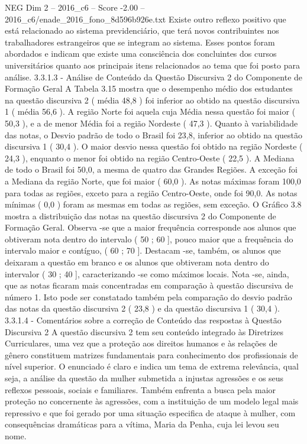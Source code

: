 \begin{textsample}{NEG Dim 2 – 2016\_c6 – Score -2.00 – 2016\_c6/enade\_2016\_fono\_8d596b926e.txt}
Existe outro reflexo positivo que está relacionado ao sistema previdenciário, que terá novos contribuintes nos trabalhadores estrangeiros que se integram ao sistema.
Esses pontos foram abordados e indicam que existe uma consciência dos concluintes dos cursos universitários quanto aos principais itens relacionados ao tema que foi posto para análise. 3.3.1.3 - Análise de Conteúdo da Questão Discursiva 2 do Componente de Formação Geral A Tabela 3.15 mostra que o desempenho médio dos estudantes na questão discursiva 2 ( média 48,8 ) foi inferior ao obtido na questão discursiva 1 ( média 56,6 ).
A região Norte foi aquela cuja Média nessa questão foi maior ( 50,3 ), e a de menor Média foi a região Nordeste ( 47,3 ).
Quanto à variabilidade das notas, o Desvio padrão de todo o Brasil foi 23,8, inferior ao obtido na questão discursiva 1 ( 30,4 ).
O maior desvio nessa questão foi obtido na região Nordeste ( 24,3 ), enquanto o menor foi obtido na região Centro-Oeste ( 22,5 ).
A Mediana de todo o Brasil foi 50,0, a mesma de quatro das Grandes Regiões.
A exceção foi a Mediana da região Norte, que foi maior ( 60,0 ).
As notas máximas foram 100,0 para todas as regiões, exceto para a região Centro-Oeste, onde foi 90,0.
As notas mínimas ( 0,0 ) foram as mesmas em todas as regiões, sem exceção.
O Gráfico 3.8 mostra a distribuição das notas na questão discursiva 2 do Componente de Formação Geral.
Observa -se que a maior frequência corresponde aos alunos que obtiveram nota dentro do intervalo ( 50 ; 60 ], pouco maior que a frequência do intervalo maior e contíguo, ( 60 ; 70 ].
Destacam -se, também, os alunos que deixaram a questão em branco e os alunos que obtiveram nota dentro do intervalor ( 30 ; 40 ], caracterizando -se como máximos locais.
Nota -se, ainda, que as notas ficaram mais concentradas em comparação à questão discursiva de número 1.
Isto pode ser constatado também pela comparação do desvio padrão das notas da questão discursiva 2 ( 23,8 ) e da questão discursiva 1 ( 30,4 ). 3.3.1.4 - Comentários sobre a correção de Conteúdo das respostas à Questão Discursiva 2 A questão discursiva 2 tem seu conteúdo integrado às Diretrizes Curriculares, uma vez que a proteção aos direitos humanos e às relações de gênero constituem matrizes fundamentais para conhecimento dos profissionais de nível superior.
O enunciado é claro e indica um tema de extrema relevância, qual seja, a análise da questão da mulher submetida a injustas agressões e os seus reflexos pessoais, sociais e familiares.
Também enfrenta a busca pela maior proteção no concernente às agressões, com a instituição de um modelo legal mais repressivo e que foi gerado por uma situação especifica de ataque à mulher, com consequências dramáticas para a vítima, Maria da Penha, cuja lei levou seu nome.

\end{textsample}
